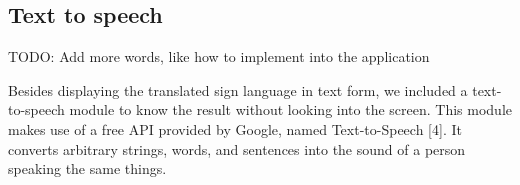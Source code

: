 \subsection{Text to speech}

TODO: Add more words, like how to implement into the application

Besides displaying the translated sign language in text form, we included a text-to-speech module to know the result without looking into the screen. This module makes use of a free API provided by Google, named Text-to-Speech [4]. It converts arbitrary strings, words, and sentences into the sound of a person speaking the same things.